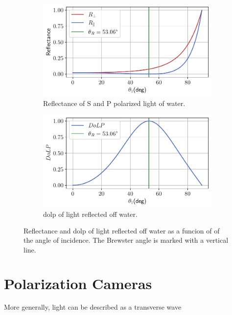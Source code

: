 \begin{figure}[H]
    \centering
    \begin{subfigure}{.5\textwidth}
        \centering
        \includegraphics[width=\textwidth]{figures/pol_plots/brewster0.pdf}
        \caption{Reflectance of S and P polarized light of water.}
        \label{fig:brewster0}
    \end{subfigure}%
    \begin{subfigure}{.5\textwidth}
        \centering
        \includegraphics[width=\textwidth]{figures/pol_plots/brewster1.pdf}
        \caption{\gls{dolp} of light reflected off water.}
        \label{fig:brewster1}
    \end{subfigure}
    \caption{Reflectance and \gls{dolp} of light reflected off water as a funcion of of the angle of incidence. The Brewster angle is marked with a vertical line.}
    \label{fig:test}
\end{figure}




\section{Polarization Cameras}
More generally, light can be described as a transverse wave



